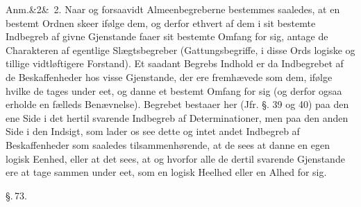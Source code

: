 \documentclass[12pt]{book}
\def\sperr#1{#1}%
\def\textit#1{#1}%
\def\emph#1{#1}%
\newcommand{\sperr}[1]{\textls[180]{#1}}
\newcommand{\parag}[1]{%
  \par\vspace{0.9\baselineskip}%
  {\centering\textit{\S.\,#1.}\par}%
  \vspace{0.35\baselineskip}%
  \noindent\hspace{\parindent}\ignorespaces
}
\newcommand{\anm}[1]{%
  \par\vspace{0.5\baselineskip}%
  \noindent\hspace{\parindent}\sperr{Anm.}\ifx&#1&\else~\textit{#1}.\fi
  \enspace\ignorespaces
}
\newcommand{\opage}[1]{\marginnote{\footnotesize\textit{[#1]}}}
\begin{document}
\anm{2} Naar og forsaavidt Almeenbegreberne bestemmes saaledes, at en bestemt
Ordnen skeer ifølge dem, og derfor ethvert af dem i sit bestemte Indbegreb af
givne Gjenstande faaer sit bestemte Omfang for sig, antage de Charakteren af
egentlige \emph{Slægtsbegreber} (Gattungsbegriffe, i disse Ords logiske og
tillige vidtløftigere Forstand). Et saadant Begrebs Indhold er da Indbegrebet af
de Beskaffenheder hos visse Gjenstande, der ere fremhævede som dem, ifølge hvilke
de tages under eet, og danne et bestemt Omfang for sig (og derfor ogsaa erholde
en fælleds Benævnelse). Begrebet bestaaer her (Jfr. §. 39 og 40) paa den ene Side
i det hertil svarende Indbegreb af Determinationer, men paa den anden Side i den
Indsigt, som lader os see dette og intet andet Indbegreb af Beskaffenheder som
\opage{198} saaledes tilsammenhørende, at de sees at danne en egen logisk Eenhed, eller at
det sees, at og hvorfor alle de dertil svarende Gjenstande ere at tage sammen
under eet, som en logisk Heelhed eller en Alhed for sig.

\parag{73}
\end{document}
